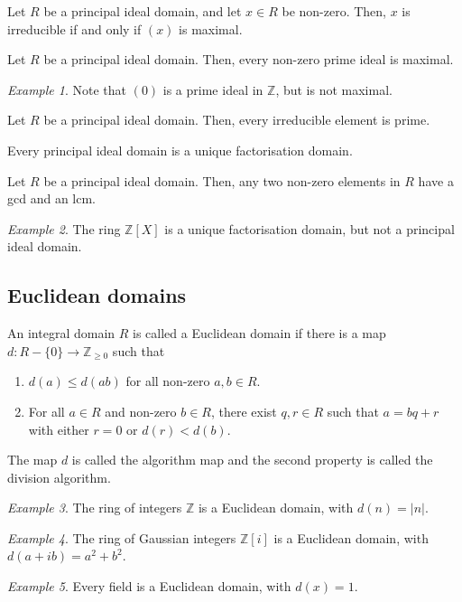 \documentclass[11pt]{article}
\newcommand{\Z}{\mathbb{Z}}
\theoremstyle{definition}
\theoremstyle{remark}
\newtheorem*{example}{Example}
\numberwithin{equation}{section}
\begin{document}
    \begin{theorem}
        Let $R$ be a principal ideal domain, and let $x \in R$ be non-zero. Then, $x$
        is irreducible if and only if $(x)$ is maximal.
    \end{theorem}
    \begin{corollary}
        Let $R$ be a principal ideal domain. Then, every non-zero prime ideal is
        maximal.
    \end{corollary}

    \begin{example}
        Note that $(0)$ is a prime ideal in $\Z$, but is not maximal.
    \end{example}

    \begin{lemma}
        Let $R$ be a principal ideal domain. Then, every irreducible element is prime.
    \end{lemma}

    \begin{theorem}
        Every principal ideal domain is a unique factorisation domain.
    \end{theorem}
    \begin{corollary}
        Let $R$ be a principal ideal domain. Then, any two non-zero elements in $R$
        have a gcd and an lcm.
    \end{corollary}
    \begin{example}
        The ring $\Z[X]$ is a unique factorisation domain, but not a principal ideal
        domain.
    \end{example}


    \subsection{Euclidean domains}
    
    \begin{definition}
        An integral domain $R$ is called a Euclidean domain if there is a map
        $d\colon R - \{0\} \to \Z_{\geq 0}$ such that \begin{enumerate}
            \itemsep0em
            \item $d(a) \leq d(ab)$ for all non-zero $a, b \in R$.
            \item For all $a \in R$ and non-zero $b \in R$, there exist $q, r \in R$
            such that $a = bq + r$ with either $r = 0$ or $d(r) < d(b)$.
        \end{enumerate}
        The map $d$ is called the algorithm map and the second property is called the
        division algorithm.
    \end{definition}
    \begin{example}
        The ring of integers $\Z$ is a Euclidean domain, with $d(n) = |n|$.
    \end{example}
    \begin{example}
        The ring of Gaussian integers $\Z[i]$ is a Euclidean domain, with $d(a + ib)
        = a^2 + b^2$.
    \end{example}
    \begin{example}
        Every field is a Euclidean domain, with $d(x) = 1$.
    \end{example}
\end{document}
